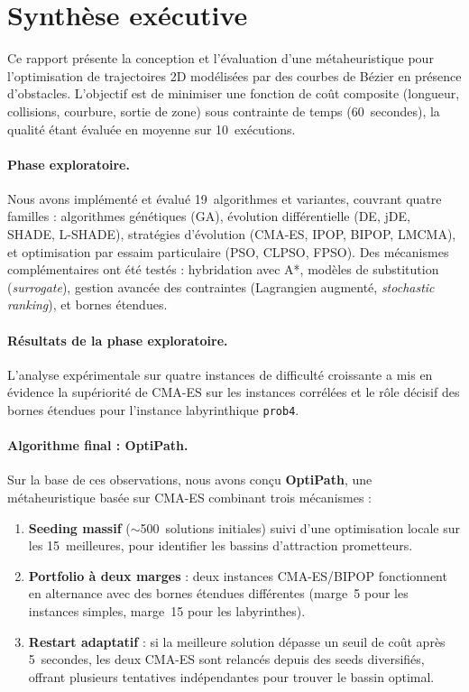 \section*{Synthèse exécutive}

Ce rapport présente la conception et l'évaluation d'une métaheuristique pour
l'optimisation de trajectoires 2D modélisées par des courbes de Bézier en
présence d'obstacles.  L'objectif est de minimiser une fonction de coût
composite (longueur, collisions, courbure, sortie de zone) sous contrainte de
temps (60~secondes), la qualité étant évaluée en moyenne sur 10~exécutions.

\paragraph{Phase exploratoire.}
Nous avons implémenté et évalué 19~algorithmes et variantes, couvrant quatre
familles : algorithmes génétiques (GA), évolution différentielle (DE, jDE,
SHADE, L-SHADE), stratégies d'évolution (CMA-ES, IPOP, BIPOP, LMCMA), et
optimisation par essaim particulaire (PSO, CLPSO, FPSO).  Des mécanismes
complémentaires ont été testés : hybridation avec A*, modèles de substitution
(\textit{surrogate}), gestion avancée des contraintes (Lagrangien augmenté,
\textit{stochastic ranking}), et bornes étendues.

\paragraph{Résultats de la phase exploratoire.}
L'analyse expérimentale sur quatre instances de difficulté croissante a mis en
évidence la supériorité de CMA-ES sur les instances corrélées et le rôle
décisif des bornes étendues pour l'instance labyrinthique \texttt{prob4}.

\paragraph{Algorithme final : OptiPath.}
Sur la base de ces observations, nous avons conçu \textbf{OptiPath}, une
métaheuristique basée sur CMA-ES combinant trois mécanismes :
\begin{enumerate}[nosep]
  \item \textbf{Seeding massif} ($\sim$500~solutions initiales) suivi d'une
        optimisation locale sur les 15~meilleures, pour identifier les bassins
        d'attraction prometteurs.
  \item \textbf{Portfolio à deux marges} : deux instances CMA-ES/BIPOP
        fonctionnent en alternance avec des bornes étendues différentes
        (marge~5 pour les instances simples, marge~15 pour les labyrinthes).
  \item \textbf{Restart adaptatif} : si la meilleure solution dépasse un seuil
        de coût après 5~secondes, les deux CMA-ES sont relancés depuis des
        seeds diversifiés, offrant plusieurs tentatives indépendantes pour
        trouver le bassin optimal.
\end{enumerate}

